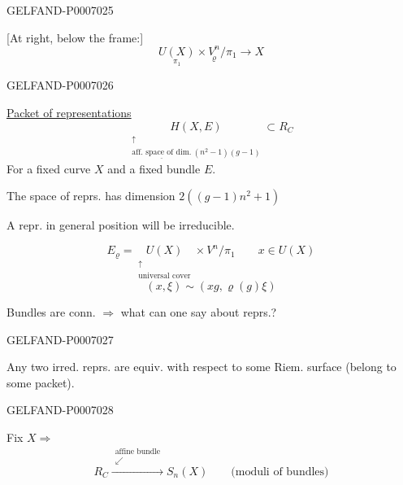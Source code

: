\begin{GelfandAdjacentEvidence}{GELFAND-P000702}{5}


[At right, below the frame:]
\[
\underset{\pi_1}{U(X)}\times\underset{\varrho}{V^n}/\pi_1\longrightarrow X
\]
\end{GelfandAdjacentEvidence}
\begin{GelfandAdjacentEvidence}{GELFAND-P000702}{6}


\underline{Packet of representations}
\[
\underset{\substack{\uparrow\\\underline{\text{aff. space of dim.}}\ (n^2-1)(g-1)}}{H(X,E)}
\subset R_C
\]
For a fixed curve \(X\) and a fixed bundle \(E\).

The space of reprs. has dimension \(2((g-1)n^2+1)\)

A repr. in general position will be irreducible.

\[
E_{\varrho}=\underset{\substack{\uparrow\\\text{universal cover}}}{U(X)}\times V^n/\pi_1
\qquad x\in U(X)
\]
\[
(x,\xi)\sim(xg,\varrho(g)\xi)
\]

Bundles are conn. \(\Rightarrow\) what can one say about reprs.?

\end{GelfandAdjacentEvidence}
\begin{GelfandAdjacentEvidence}{GELFAND-P000702}{7}


Any two irred. reprs. are equiv. with respect to some Riem. surface (belong to some packet).

\end{GelfandAdjacentEvidence}
\begin{GelfandAdjacentEvidence}{GELFAND-P000702}{8}

\end{GelfandAdjacentEvidence}


Fix \(X\Rightarrow\)
\[
R_C\overset{\substack{\text{affine bundle}\\\swarrow}}{\longrightarrow}S_n(X)
\qquad\text{(moduli of bundles)}
\]


